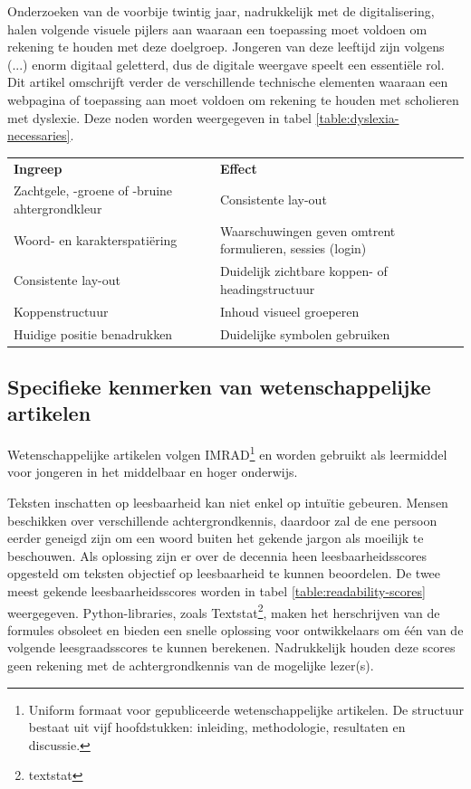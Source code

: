 \medspace

Onderzoeken van de voorbije twintig jaar, nadrukkelijk met de digitalisering, halen volgende visuele pijlers aan waaraan een toepassing moet voldoen om rekening te houden met deze doelgroep. Jongeren van deze leeftijd zijn volgens (...) enorm digitaal geletterd, dus de digitale weergave speelt een essentiële rol. Dit artikel omschrijft verder de verschillende technische elementen waaraan een webpagina of toepassing aan moet voldoen om rekening te houden met scholieren met dyslexie. Deze noden worden weergegeven in tabel \ref{table:dyslexia-necessaries}. %

\begin{center}
	\begin{tabular}{ | m{8cm} | m{8cm} | } 
		\hline
		\textbf{Ingreep} & \textbf{Effect} \\ 
		Zachtgele, -groene of -bruine ahtergrondkleur & Consistente lay-out \\
		\hline
		Woord- en karakterspatiëring & Waarschuwingen geven omtrent formulieren, sessies (login) \\ 
		\hline
		Consistente lay-out & Duidelijk zichtbare koppen- of headingstructuur \\ 
		\hline
		Koppenstructuur &  Inhoud visueel groeperen \\
		\hline
		Huidige positie benadrukken & Duidelijke symbolen gebruiken \\
		\hline
	\end{tabular}
	\label{table:dyslexia-necessaries}
\end{center}

\subsection{Specifieke kenmerken van wetenschappelijke artikelen}

Wetenschappelijke artikelen volgen IMRAD\footnote{Uniform formaat voor gepubliceerde wetenschappelijke artikelen. De structuur bestaat uit vijf hoofdstukken: inleiding, methodologie, resultaten en discussie.} en worden gebruikt als leermiddel voor jongeren in het middelbaar en hoger onderwijs. 

\medspace

Teksten inschatten op leesbaarheid kan niet enkel op intuïtie gebeuren. Mensen beschikken over verschillende achtergrondkennis, daardoor zal de ene persoon eerder geneigd zijn om een woord buiten het gekende jargon als moeilijk te beschouwen. Als oplossing zijn er over de decennia heen leesbaarheidsscores opgesteld om teksten objectief op leesbaarheid te kunnen beoordelen. De twee meest gekende leesbaarheidsscores worden in tabel \ref{table:readability-scores} weergegeven. Python-libraries, zoals Textstat\footnote{textstat}, maken het herschrijven van de formules obsoleet en bieden een snelle oplossing voor ontwikkelaars om één van de volgende leesgraadsscores te kunnen berekenen. Nadrukkelijk houden deze scores geen rekening met de achtergrondkennis van de mogelijke lezer(s).

